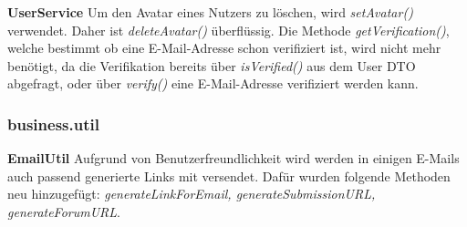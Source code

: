 \textbf{UserService} Um den Avatar eines Nutzers zu löschen, wird \emph{setAvatar()} verwendet. Daher ist \emph{deleteAvatar()} überflüssig. \newline
Die Methode \emph{getVerification()}, welche bestimmt ob eine E-Mail-Adresse schon verifiziert ist, wird nicht mehr benötigt, da die Verifikation bereits über \emph{isVerified()} aus dem User DTO abgefragt, oder über \emph{verify()} eine E-Mail-Adresse verifiziert werden kann.

\subsubsection{business.util}

\textbf{EmailUtil} Aufgrund von Benutzerfreundlichkeit wird
werden in einigen E-Mails auch passend generierte Links mit versendet. Dafür wurden folgende Methoden neu hinzugefügt: \emph{generateLinkForEmail, generateSubmissionURL, generateForumURL}.


